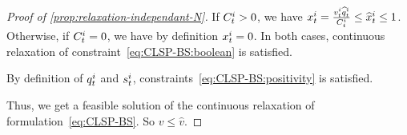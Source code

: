 \begin{proof}[Proof of \cref{prop:relaxation-independant-N}]
If $C_t^i>0$, we have $x_t^i=\frac{v_t^i\widehat{q}_t^i}{C_t^i}\le\widehat{x}_t^i\le 1$.
Otherwise, if $C_t^i=0$, we have by definition $x_t^i=0$.
In both cases, continuous relaxation of constraint~\eqref{eq:CLSP-BS:boolean} is satisfied.

By definition of $q_t^i$ and $s_t^i$, constraints~\eqref{eq:CLSP-BS:positivity} is satisfied.

Thus, we get a feasible solution of the continuous relaxation of formulation~\eqref{eq:CLSP-BS}. So $v \le \widehat{v}$.
\end{proof}







